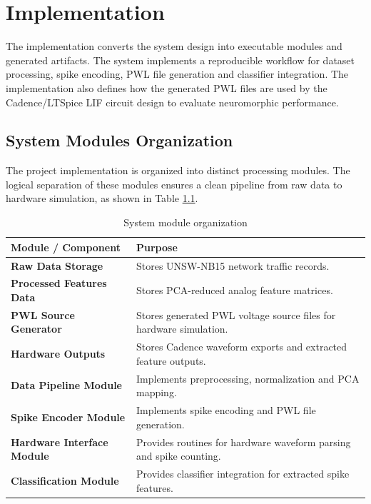 \chapter{Implementation}

The implementation converts the system design into executable modules and generated artifacts. The system implements a reproducible workflow for dataset processing, spike encoding, PWL file generation and classifier integration. The implementation also defines how the generated PWL files are used by the Cadence/LTSpice LIF circuit design to evaluate neuromorphic performance.

\section{System Modules Organization}

The project implementation is organized into distinct processing modules. The logical separation of these modules ensures a clean pipeline from raw data to hardware simulation, as shown in Table \ref{tab:repo}.

\begin{table}[H]
\centering
\caption{System module organization}
\label{tab:repo}
\begin{tabular}{|p{}|p{}|}
\hline
\textbf{Module / Component} & \textbf{Purpose} \\
\hline
\textbf{Raw Data Storage} & Stores UNSW-NB15 network traffic records. \\
\hline
\textbf{Processed Features Data} & Stores PCA-reduced analog feature matrices. \\
\hline
\textbf{PWL Source Generator} & Stores generated PWL voltage source files for hardware simulation. \\
\hline
\textbf{Hardware Outputs} & Stores Cadence waveform exports and extracted feature outputs. \\
\hline
\textbf{Data Pipeline Module} & Implements preprocessing, normalization and PCA mapping. \\
\hline
\textbf{Spike Encoder Module} & Implements spike encoding and PWL file generation. \\
\hline
\textbf{Hardware Interface Module} & Provides routines for hardware waveform parsing and spike counting. \\
\hline
\textbf{Classification Module} & Provides classifier integration for extracted spike features. \\
\hline
\end{tabular}
\end{table}

